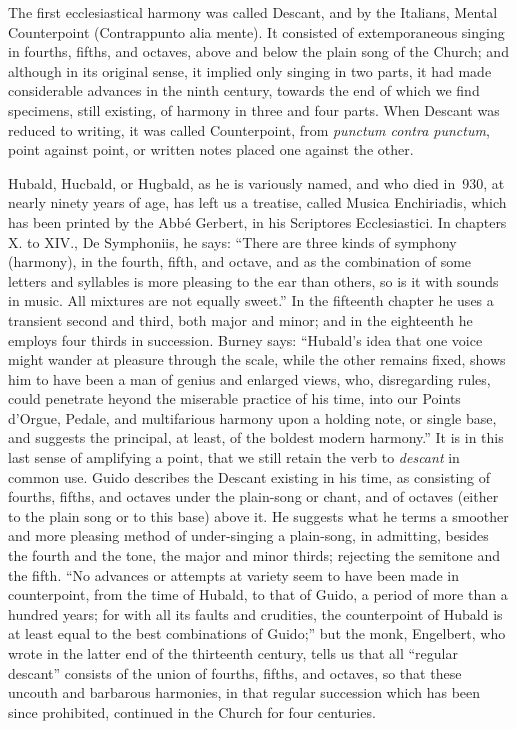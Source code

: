 The first ecclesiastical harmony was called Descant, and by the Italians, Mental
Counterpoint (Contrappunto alia mente). It consisted of extemporaneous singing
in fourths, fifths, and octaves, above and below the plain song of the Church; and
although in its original sense, it implied only singing in two parts, it had made
considerable advances in the ninth century, towards the end of which we find
specimens, still existing, of harmony in three and four parts. When Descant was
reduced to writing, it was called Counterpoint, from \textit{punctum contra punctum},
point against point, or written notes placed one against the other.

Hubald, Hucbald, or Hugbald, as he is variously named, and who died in~930,
at nearly ninety years of age, has left us a treatise, called Musica Enchiriadis,
which has been printed by the Abbé Gerbert, in his Scriptores Ecclesiastici. In
chapters X. to XIV., De Symphoniis, he says: “There are three kinds of
symphony (harmony), in the fourth, fifth, and octave, and as the combination of
some letters and syllables is more pleasing to the ear than others, so is it with
sounds in music. All mixtures are not equally sweet.” In the fifteenth chapter
he uses a transient second and third, both major and minor; and in the eighteenth
he employs four thirds in succession. Burney says: “Hubald’s idea that one
voice might wander at pleasure through the scale, while the other remains fixed,
shows him to have been a man of genius and enlarged views, who, disregarding
rules, could penetrate heyond the miserable practice of his time, into our Points
d’Orgue, Pedale, and multifarious harmony upon a holding note, or single base,
and suggests the principal, at least, of the boldest modern harmony.” It is in
this last sense of amplifying a point, that we still retain the verb to \textit{descant} in
common use. Guido describes the Descant \pagebreak
existing in his time, as consisting of 
fourths, fifths, and octaves under the plain-song or chant, and of octaves (either 
to the plain song or to this base) above it. He suggests what he terms a smoother
and more pleasing method of under-singing a plain-song, in admitting, besides the
fourth and the tone, the major and minor thirds; rejecting the semitone and the
fifth. “No advances or attempts at variety seem to have been made in counterpoint,
from the time of Hubald, to that of Guido, a period of more than a hundred
years; for with all its faults and crudities, the counterpoint of Hubald is at least
equal to the best combinations of Guido;” but the monk, Engelbert, who wrote in
the latter end of the thirteenth century, tells us that all “regular descant” consists
of the union of fourths, fifths, and octaves, so that these uncouth and barbarous
harmonies, in that regular succession which has been since prohibited,
continued in the Church for four centuries.



